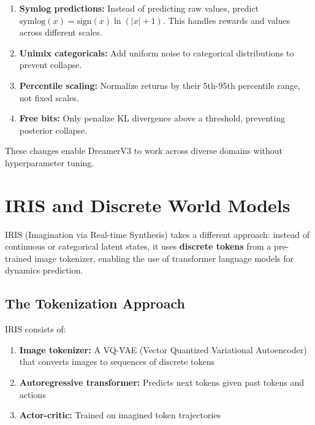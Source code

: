 \begin{enumerate}
    \item \textbf{Symlog predictions:} Instead of predicting raw values, predict $\text{symlog}(x) = \text{sign}(x) \ln(|x| + 1)$. This handles rewards and values across different scales.

    \item \textbf{Unimix categoricals:} Add uniform noise to categorical distributions to prevent collapse.

    \item \textbf{Percentile scaling:} Normalize returns by their 5th-95th percentile range, not fixed scales.

    \item \textbf{Free bits:} Only penalize KL divergence above a threshold, preventing posterior collapse.
\end{enumerate}

These changes enable DreamerV3 to work across diverse domains without hyperparameter tuning.

\section{IRIS and Discrete World Models}
\label{sec:iris}

IRIS (Imagination via Real-time Synthesis) takes a different approach: instead of continuous or categorical latent states, it uses \textbf{discrete tokens} from a pre-trained image tokenizer, enabling the use of transformer language models for dynamics prediction.

\subsection{The Tokenization Approach}

\begin{definition}
IRIS consists of:
\begin{enumerate}
    \item \textbf{Image tokenizer:} A VQ-VAE (Vector Quantized Variational Autoencoder) that converts images to sequences of discrete tokens
    \item \textbf{Autoregressive transformer:} Predicts next tokens given past tokens and actions
    \item \textbf{Actor-critic:} Trained on imagined token trajectories
\end{enumerate}
\end{definition}

